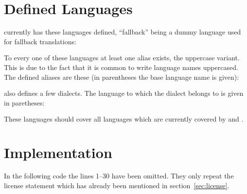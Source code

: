 \documentclass[DIV9,toc=index,toc=bib,numbers=noendperiod]{cnpkgdoc}
\begin{document}

\section{Defined Languages}\label{sec:languages}
\translations currently has these languages defined, ``fallback'' being a
dummy language used for fallback translations:

\begin{quote}
  \makeatletter\raggedright
  \def\comma{\gdef\comma{,\quad}}%
  \def\do#1{\comma #1}%
  \dolistloop\@trnslt@languages
\end{quote}

To every one of these languages at least one alias exists, the uppercase
variant.  This is due to the fact that it is common to write language names
uppercased.  The defined aliases are these (in parentheses the base language
name is given):

\begin{quote}
  \makeatletter\raggedright
  \def\comma{\gdef\comma{,\quad}}
  \def\aliases#1#2{\comma #1 (#2)}
  \def\do#1{\aliases#1}
  \dolistloop\@trnslt@aliases@pair
\end{quote}

\translations also defines a few dialects.  The language to which the dialect
belongs to is given in paretheses:

\begin{quote}
  \makeatletter\raggedright
  \def\comma{\gdef\comma{,\quad}}
  \def\aliases#1#2{\comma #1 (#2)}
  \def\do#1{\aliases#1}
  \dolistloop\@trnslt@dialects@pair
\end{quote}

These languages should cover all languages which are currently covered by
 and .

\section{Implementation}
In the following code the lines 1--30 have been omitted. They only repeat the
license statement which has already been mentioned in section~\ref{sec:license}.

\implementation[linerange={31-1000},firstnumber=31]


\printindex
\end{document}
